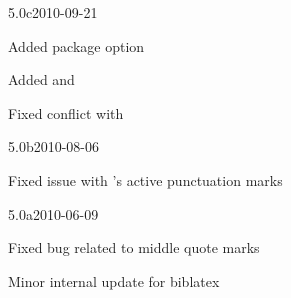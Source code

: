 \documentclass{ltxdockit}[2010/09/26]
\begin{document}
\begin{changelog}
\begin{release}{5.0c}{2010-09-21}
\item Added package option 
\item Added  and 
\item Fixed conflict with 
\end{release}

\begin{release}{5.0b}{2010-08-06}
\item Fixed issue with 's active punctuation marks
\end{release}

\begin{release}{5.0a}{2010-06-09}
\item Fixed bug related to middle quote marks
\item Minor internal update for biblatex
\end{release}


\end{changelog}
\end{document}
